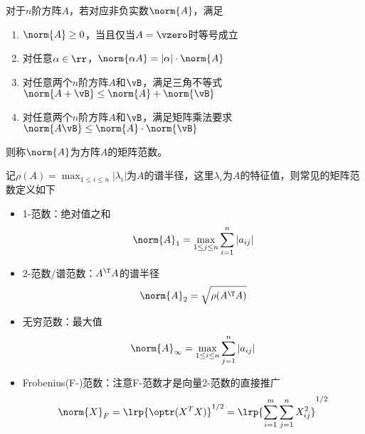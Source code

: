 \begin{definition}[矩阵的范数]
    对于$n$阶方阵$A$，若对应非负实数$\norm{A}$，满足
    \begin{enumerate}
        \item $\norm{A}\geq 0$，当且仅当$A=\vzero$时等号成立
        \item 对任意$\alpha\in\rr$，$\norm{\alpha A}=|\alpha|\cdot\norm{A}$
        \item 对任意两个$n$阶方阵$A$和$\vB$，满足三角不等式$\norm{A+\vB}\leq\norm{A}+\norm{\vB}$
        \item 对任意两个$n$阶方阵$A$和$\vB$，满足矩阵乘法要求$\norm{A\vB}\leq\norm{A}\cdot\norm{\vB}$
    \end{enumerate}
    则称$\norm{A}$为方阵$A$的矩阵范数。
\end{definition}

记$\rho(A)=\max_{1\leq i\leq n}|\lambda_i|$为$A$的谱半径，这里$\lambda_i$为$A$的特征值，则常见的矩阵范数定义如下
\begin{itemize}
    \item 1-范数：绝对值之和
    \[\norm{A}_1=\max_{1\leq j\leq n}\sum_{i=1}^n|a_{ij}|\]
    \item 2-范数/谱范数：$A^\T A$的谱半径
    \[\norm{A}_2=\sqrt{\rho(A^\T A)}\]
    \item 无穷范数：最大值
    \[\norm{A}_\infty=\max_{1\leq i\leq n}\sum_{j=1}^n|a_{ij}|\]
    \item Frobenius(F-)范数：注意F-范数才是向量2-范数的直接推广
    \[\norm{X}_F=\lrp{\optr(X^T X)}^{1/2}=\lrp{\sum_{i=1}^m\sum_{j=1}^n X_{ij}^2}^{1/2}\]
\end{itemize}

